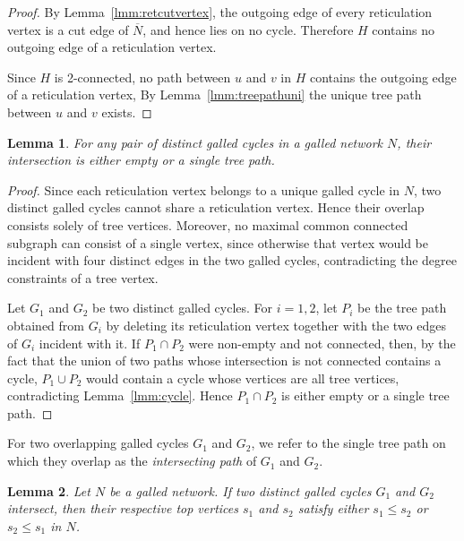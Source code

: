 \documentclass[pdflatex,sn-mathphys-num]{sn-jnl}
\theoremstyle{thmstyleone}%
\theoremstyle{thmstyletwo}%
\newtheorem{lemma}{Lemma}
\theoremstyle{thmstylethree}%
\begin{document}
\begin{proof}
By Lemma~\ref{lmm:retcutvertex}, the outgoing edge of every reticulation vertex is a cut edge of $\overline{N}$, and hence lies on no cycle. Therefore $H$ contains no outgoing edge of a reticulation vertex.

Since $H$ is 2-connected, no path between $u$ and $v$ in $H$ contains the outgoing edge of a reticulation vertex, By Lemma~\ref{lmm:treepathuni} the unique tree path between $u$ and $v$ exists.
\end{proof}



\begin{lemma} \label{lmm:overlapone}
For any pair of distinct galled cycles in a galled network $N$, their intersection is either empty or a single tree path.
\end{lemma}

\begin{proof}
Since each reticulation vertex belongs to a unique galled cycle in $N$, two distinct galled cycles cannot share a reticulation vertex. Hence their overlap consists solely of tree vertices. Moreover, no maximal common connected subgraph can consist of a single vertex, since otherwise that vertex would be incident with four distinct edges in the two galled cycles, contradicting the degree constraints of a tree vertex.

Let $G_1$ and $G_2$ be two distinct galled cycles. For $i=1,2$, let $P_i$ be the tree path obtained from $G_i$ by deleting its reticulation vertex together with the two edges of $G_i$ incident with it. If $P_1\cap P_2$ were non-empty and not connected, then, by the fact that the union of two paths whose intersection is not connected contains a cycle, $P_1\cup P_2$ would contain a cycle whose vertices are all tree vertices, contradicting Lemma~\ref{lmm:cycle}. Hence $P_1\cap P_2$ is either empty or a single tree path.
\end{proof}




For two overlapping galled cycles $G_1$ and $G_2$, we refer to the single tree path on which they overlap as the \emph{intersecting path} of $G_1$ and $G_2$. 




\begin{lemma} \label{lmm:twotopcompa}
Let $N$ be a galled network. If two distinct galled cycles $G_1$ and $G_2$ intersect, then their respective top vertices $s_1$ and $s_2$ satisfy either $s_1 \leq s_2$ or $s_2 \leq s_1$ in $N$.
\end{lemma}
\end{document}
